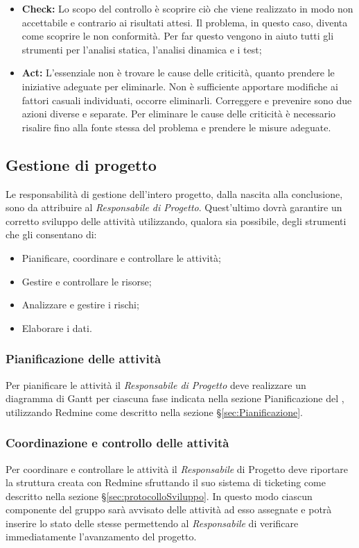 \begin{itemize}
\begin{itemize}
 \end{itemize}
  \item \textbf{Check:} 
  Lo scopo del controllo è scoprire ciò che viene realizzato in modo non accettabile e contrario ai risultati attesi. Il problema, in questo caso, diventa come scoprire le non conformità. Per far questo vengono in aiuto tutti gli strumenti per l'analisi statica, l'analisi dinamica e i test;
  \item \textbf{Act:}
  L’essenziale non è trovare le cause delle criticità, quanto prendere le iniziative adeguate per eliminarle. Non è sufficiente apportare modifiche ai fattori casuali individuati, occorre eliminarli. Correggere e prevenire sono due azioni diverse e
  separate. Per eliminare le cause delle criticità è necessario risalire fino alla fonte stessa del problema e prendere le misure adeguate. 
  
\end{itemize}

\subsection{Gestione di progetto}
Le responsabilità di gestione dell’intero progetto, dalla nascita alla conclusione, sono da
attribuire al \emph{Responsabile di Progetto}.
Quest’ultimo dovrà garantire un corretto sviluppo delle attività utilizzando, qualora sia possibile, degli strumenti che gli consentano di:
\begin{itemize}
\item Pianificare, coordinare e controllare le attività;
\item Gestire e controllare le risorse;
\item Analizzare e gestire i rischi;
\item Elaborare i dati.
\end{itemize}
\subsubsection{Pianificazione delle attività}
Per pianificare le attività il \emph{Responsabile di Progetto} deve realizzare un diagramma di
Gantt  per ciascuna fase indicata nella sezione Pianificazione del \href{run:../../Esterni/\fPianoDiProgetto}{\fEscapePianoDiProgetto} , utilizzando Redmine come descritto nella sezione \S\ref{sec:Pianificazione}.
\subsubsection{Coordinazione e controllo delle attività}
Per coordinare e controllare le attività il \emph{Responsabile} di Progetto deve riportare la struttura creata con Redmine sfruttando il suo sistema di ticketing
come descritto nella sezione \S\ref{sec:protocolloSviluppo}.
In questo modo ciascun componente del gruppo sarà avvisato delle attività ad esso assegnate e potrà inserire lo stato delle stesse permettendo al \emph{Responsabile} di verificare immediatamente l’avanzamento del progetto.

